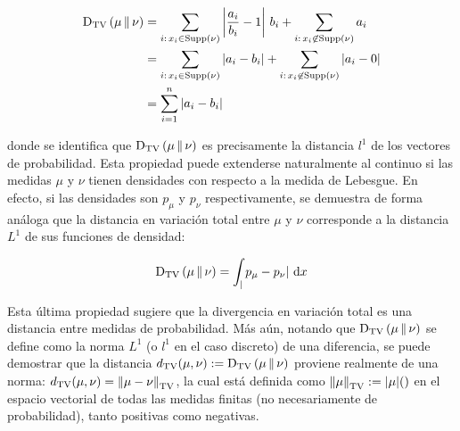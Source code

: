 \begin{align}
	\operatorname{D_{TV}}\left(\mu\,\|\,\nu\right) & = \sum_{i:\, x_i\in\operatorname{Supp}\left(\nu\right)} \left|\frac{a_i}{b_i} - 1\right|\, b_i + \sum_{i:\, x_i\not\in\operatorname{Supp}\left(\nu\right)} a_i \\
	              & = \sum_{i:\, x_i\in\operatorname{Supp}\left(\nu\right)} |a_i - b_i| + \sum_{i:\, x_i\not\in\operatorname{Supp}\left(\nu\right)} |a_i - 0|                      \\
	              & = \sum_{i=1}^n |a_i - b_i|
\end{align}

donde se identifica que $\operatorname{D_{TV}}\left(\mu\,\|\,\nu\right)$ es precisamente la distancia $l^1$ de los vectores de probabilidad. Esta propiedad puede extenderse naturalmente al continuo si las medidas $\mu$ y $\nu$ tienen densidades con respecto a la medida de Lebesgue. En efecto, si las densidades son $p_\mu$ y $p_\nu$ respectivamente, se demuestra de forma análoga que la distancia en variación total entre $\mu$ y $\nu$ corresponde a la distancia $L^1$ de sus funciones de densidad:

\begin{equation}
	\operatorname{D_{TV}}\left(\mu\,\|\,\nu\right) = \int_ |p_\mu - p_\nu| \,\operatorname{d}\! x
\end{equation}

Esta última propiedad sugiere que la divergencia en variación total es una distancia entre medidas de probabilidad. Más aún, notando que $\operatorname{D_{TV}}\left(\mu\,\|\,\nu\right)$ se define como la norma $L^1$ (o $l^1$ en el caso discreto) de una diferencia, se puede demostrar que la distancia $d_{\operatorname{TV}}(\mu,\nu) := \operatorname{D_{TV}}\left(\mu\,\|\,\nu\right)$ proviene realmente de una norma: $d_{\operatorname{TV}}(\mu,\nu) = \left\lVert \mu-\nu \right\rVert_{\operatorname{TV}}$, la cual está definida como $\left\lVert \mu \right\rVert_{\operatorname{TV}} := |\mu|()$ en el espacio vectorial de todas las medidas finitas (no necesariamente de probabilidad), tanto positivas como negativas.


